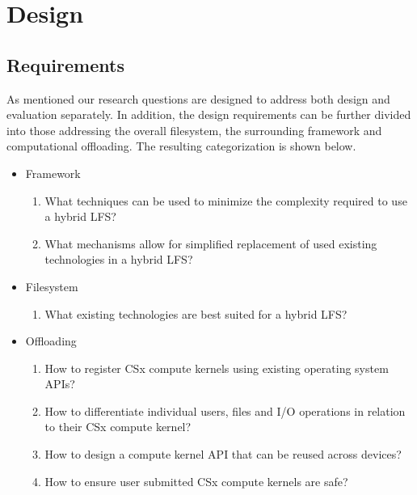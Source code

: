 
\chapter{Design} %



\ifpdf
    \graphicspath{{7/figures/PNG/}{7/figures/PDF/}{7/figures/}}
\else
    \graphicspath{{7/figures/EPS/}{7/figures/}}
\fi


% 

\section{Requirements}

As mentioned our research questions are designed to address both design and
evaluation separately. In addition, the design requirements can be further
divided into those addressing the overall filesystem, the surrounding
framework and computational offloading. The resulting categorization is shown
below.

\begin{itemize}
    \item Framework
    \begin{enumerate}
        \item What techniques can be used to minimize the complexity required to
            use a hybrid LFS?
        \item What mechanisms allow for simplified replacement of used existing
            technologies in a hybrid LFS?
    \end{enumerate}
    \item Filesystem
    \begin{enumerate}
        \item What existing technologies are best suited for a hybrid LFS?
    \end{enumerate}
    \item Offloading
    \begin{enumerate}
        \item How to register CSx compute kernels using existing operating
            system APIs?
        \item How to differentiate individual users, files and I/O operations in
            relation to their CSx compute kernel?
        \item How to design a compute kernel API that can be reused across devices?
        \item How to ensure user submitted CSx compute kernels are safe?
    \end{enumerate}
\end{itemize}

